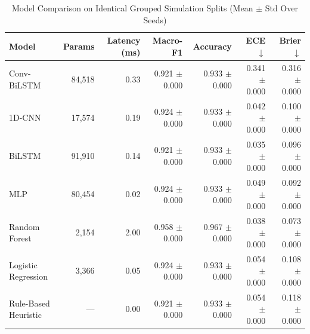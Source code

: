 \begin{table}[htbp]
\centering
\caption{Model Comparison on Identical Grouped Simulation Splits (Mean $\pm$ Std Over Seeds)}
\label{tab:model_comparison}
\begin{tabular}{lrrrrrr}
\toprule
Model & Params & Latency (ms) & Macro-F1 & Accuracy & ECE $\downarrow$ & Brier $\downarrow$ \\
\midrule
Conv-BiLSTM & 84,518 & 0.33 & 0.921 $\pm$ 0.000 & 0.933 $\pm$ 0.000 & 0.341 $\pm$ 0.000 & 0.316 $\pm$ 0.000 \\
1D-CNN & 17,574 & 0.19 & 0.924 $\pm$ 0.000 & 0.933 $\pm$ 0.000 & 0.042 $\pm$ 0.000 & 0.100 $\pm$ 0.000 \\
BiLSTM & 91,910 & 0.14 & 0.921 $\pm$ 0.000 & 0.933 $\pm$ 0.000 & 0.035 $\pm$ 0.000 & 0.096 $\pm$ 0.000 \\
MLP & 80,454 & 0.02 & 0.924 $\pm$ 0.000 & 0.933 $\pm$ 0.000 & 0.049 $\pm$ 0.000 & 0.092 $\pm$ 0.000 \\
Random Forest & 2,154 & 2.00 & 0.958 $\pm$ 0.000 & 0.967 $\pm$ 0.000 & 0.038 $\pm$ 0.000 & 0.073 $\pm$ 0.000 \\
Logistic Regression & 3,366 & 0.05 & 0.924 $\pm$ 0.000 & 0.933 $\pm$ 0.000 & 0.054 $\pm$ 0.000 & 0.108 $\pm$ 0.000 \\
Rule-Based Heuristic & --- & 0.00 & 0.921 $\pm$ 0.000 & 0.933 $\pm$ 0.000 & 0.054 $\pm$ 0.000 & 0.118 $\pm$ 0.000 \\
\bottomrule
\end{tabular}
\end{table}
